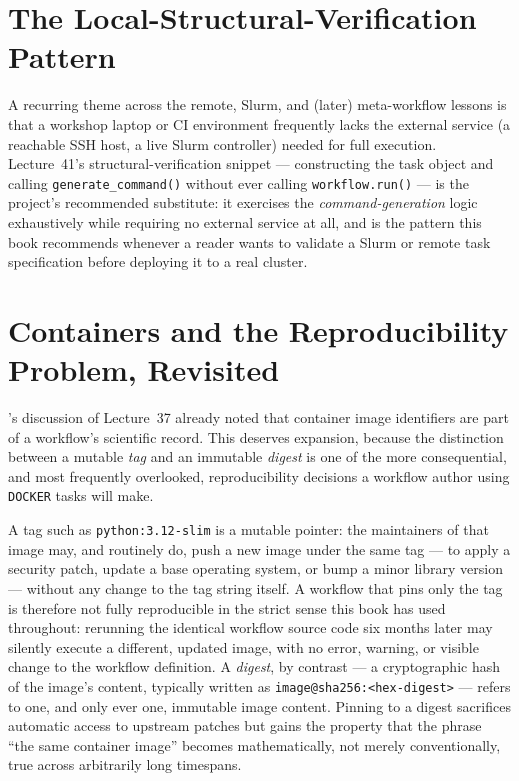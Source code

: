 \section{The Local-Structural-Verification Pattern}

A recurring theme across the remote, Slurm, and (later) meta-workflow lessons
is that a workshop laptop or CI environment frequently lacks the external
service (a reachable SSH host, a live Slurm controller) needed for full
execution. Lecture~41's structural-verification snippet --- constructing the
task object and calling \texttt{generate\_command()} without ever calling
\texttt{workflow.run()} --- is the project's recommended substitute: it
exercises the \emph{command-generation} logic exhaustively while requiring no
external service at all, and is the pattern this book recommends whenever a
reader wants to validate a Slurm or remote task specification before
deploying it to a real cluster.

\section{Containers and the Reproducibility Problem, Revisited}

's discussion of Lecture~37 already noted that container
image identifiers are part of a workflow's scientific record. This deserves
expansion, because the distinction between a mutable \emph{tag} and an
immutable \emph{digest} is one of the more consequential, and most
frequently overlooked, reproducibility decisions a workflow author using
\texttt{DOCKER} tasks will make.

A tag such as \texttt{python:3.12-slim} is a mutable pointer: the
maintainers of that image may, and routinely do, push a new image under the
same tag --- to apply a security patch, update a base operating system, or
bump a minor library version --- without any change to the tag string
itself. A workflow that pins only the tag is therefore not fully
reproducible in the strict sense this book has used throughout: rerunning
the identical workflow source code six months later may silently execute a
different, updated image, with no error, warning, or visible change to the
workflow definition. A \emph{digest}, by contrast --- a cryptographic hash
of the image's content, typically written as
\texttt{image@sha256:<hex-digest>} --- refers to one, and only ever one,
immutable image content. Pinning to a digest sacrifices automatic access to
upstream patches but gains the property that the phrase ``the same
container image'' becomes mathematically, not merely conventionally, true
across arbitrarily long timespans.

